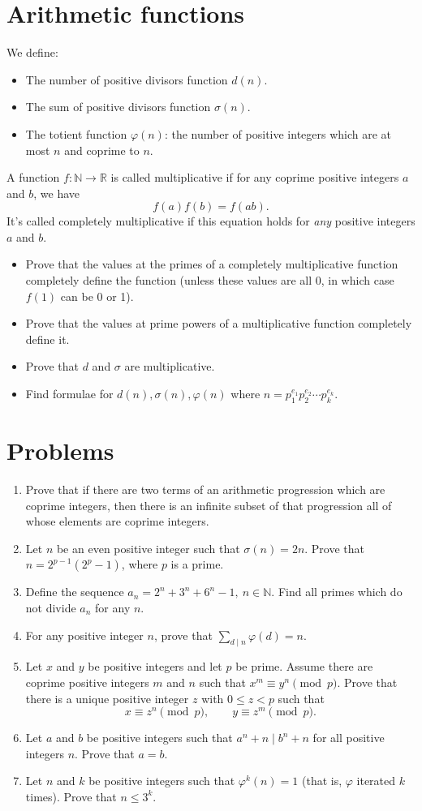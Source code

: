 \documentclass{article}
\begin{document}
\section{Arithmetic functions}
  We define:
  \begin{itemize}
    \item The number of positive divisors function $d(n)$.
    \item The sum of positive divisors function $\sigma(n)$.
    \item The totient function $\varphi(n)$: the number of positive integers
      which are at most $n$ and coprime to $n$.
  \end{itemize}
  A function $f:\mathbb N\to\mathbb R$ is called multiplicative if for any
  coprime positive integers $a$ and $b$, we have
  \[f(a)f(b)=f(ab).\]
  It's called completely multiplicative if this equation holds for \emph{any}
  positive integers $a$ and $b$.
  \begin{itemize}
    \item Prove that the values at the primes of a completely multiplicative
      function completely define the function (unless these values are all 0, in
      which case $f(1)$ can be 0 or 1).
    \item Prove that the values at prime powers of a multiplicative function
      completely define it. 
    \item Prove that $d$ and $\sigma$ are multiplicative.
    \item
      Find formulae for $d(n),\sigma(n),\varphi(n)$ where
      $n=p_1^{e_1}p_2^{e_2}\cdots p_k^{e_k}$.
  \end{itemize}
\section{Problems}
\begin{enumerate}
  \item Prove that if there are two terms of an arithmetic progression which are
    coprime integers, then there is an infinite subset of that
    progression all of whose elements are coprime integers.
  \item Let $n$ be an even positive integer such that $\sigma(n)=2n$. Prove that
    $n=2^{p-1}\left(2^p-1\right)$, where $p$ is a prime.
  \item Define the sequence $a_n=2^n+3^n+6^n-1,\ n\in\mathbb N$.
    Find all primes which do not divide $a_n$ for any $n$.
  \item For any positive integer $n$, prove that $\displaystyle\sum_{d\mid
    n}\varphi(d)=n$.
  \item Let $x$ and $y$ be positive integers and let $p$ be prime. Assume there
    are coprime positive integers $m$ and $n$ such that $x^m\equiv y^n\pmod p$.
    Prove that there is a unique positive integer $z$ with $0\le z<p$ such that
    \[x\equiv z^n\pmod p,\qquad y\equiv z^m\pmod p.\]
  \item Let $a$ and $b$ be positive integers such that $a^n+n\mid b^n+n$ for all
    positive integers $n$. Prove that $a=b$.
  \item Let $n$ and $k$ be positive integers such that $\varphi^k(n)=1$ (that
    is, $\varphi$ iterated $k$ times). Prove that
    $n\le 3^k$.
\end{enumerate}
\newpage
\end{document}
